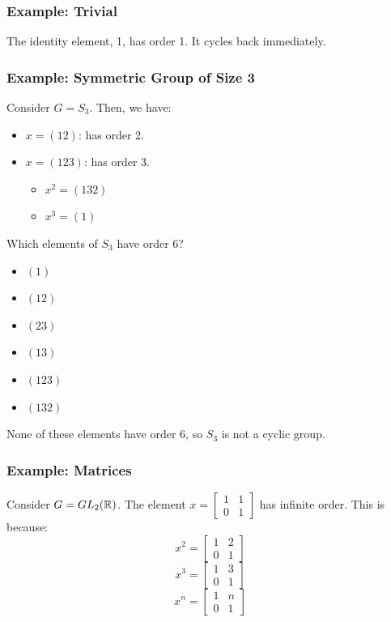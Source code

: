 \documentclass[letterpaper]{article}
\begin{document}
\subsubsection{Example: Trivial}
The identity element, 1, has order 1. It cycles back immediately. 

\subsubsection{Example: Symmetric Group of Size 3}
Consider $G = S_3$. Then, we have: 
\begin{itemize}
    \item $x = (1 2)$: has order 2. 
    \item $x = (1 2 3)$: has order 3.
    \begin{itemize}
        \item $x^2 = (1 3 2)$
        \item $x^3 = (1)$
    \end{itemize}
\end{itemize}
Which elements of $S_3$ have order 6? 
\begin{itemize}
    \item $(1)$
    \item $(1 2)$
    \item $(2 3)$
    \item $(1 3)$
    \item $(1 2 3)$
    \item $(1 3 2)$
\end{itemize}
None of these elements have order 6, so $S_3$ is not a cyclic group. 

\subsubsection{Example: Matrices}
Consider $G = GL_{2}(\mathbb{R})$. The element $x = \begin{bmatrix}
    1 & 1 \\ 
    0 & 1
\end{bmatrix}$ has infinite order. This is because: 
\[x^2 = \begin{bmatrix}
    1 & 2 \\ 
    0 & 1
\end{bmatrix}\]
\[x^3 = \begin{bmatrix}
    1 & 3 \\ 
    0 & 1
\end{bmatrix}\]
\[x^n = \begin{bmatrix}
    1 & n \\ 
    0 & 1
\end{bmatrix}\]
\end{document}
